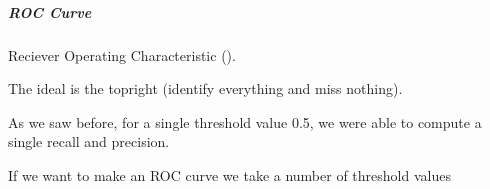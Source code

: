\documentclass[letterpaper,10pt,english]{sphinxmanual}
\begin{document}
\subparagraph{ROC Curve}
\label{\detokenize{04-BasicSegmentation_Part2:roc-curve}}
\sphinxAtStartPar
Reciever Operating Characteristic ().

\sphinxAtStartPar
The ideal is the top\sphinxhyphen{}right (identify everything and miss nothing).

\sphinxAtStartPar
As we saw before, for a single threshold value 0.5, we were able to compute a single recall and precision.

\sphinxAtStartPar
If we want to make an ROC curve we take a number of threshold values

\begin{sphinxVerbatim}[commandchars=\\\{\}]
   
   


\end{sphinxVerbatim}
\end{document}

